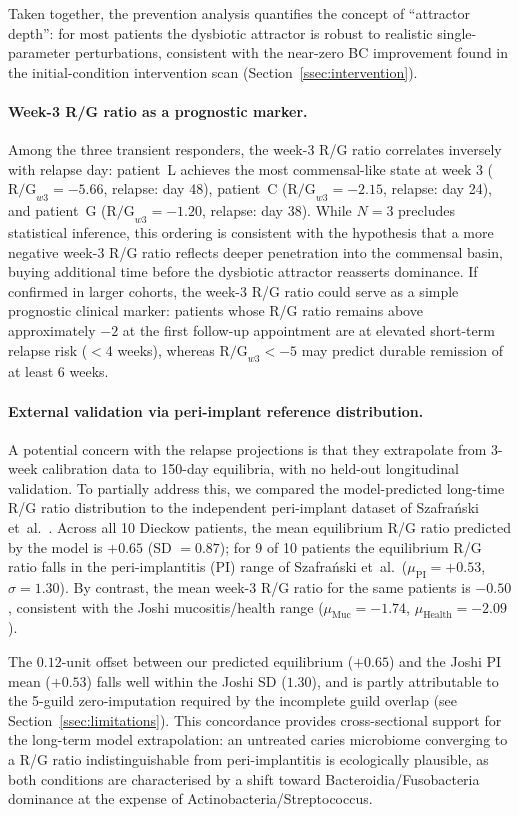 \documentclass[11pt,a4paper]{article}
\begin{document}
Taken together, the prevention analysis quantifies the concept of ``attractor depth'':
for most patients the dysbiotic attractor is robust to realistic single-parameter
perturbations, consistent with the near-zero BC improvement found in the initial-condition
intervention scan (Section~\ref{ssec:intervention}).

\paragraph{Week-3 R/G ratio as a prognostic marker.}
Among the three transient responders, the week-3 R/G ratio correlates inversely with relapse day:
patient~L achieves the most commensal-like state at week 3
($\text{R/G}_{w3} = -5.66$, relapse: day 48), patient~C
($\text{R/G}_{w3} = -2.15$, relapse: day 24), and patient~G
($\text{R/G}_{w3} = -1.20$, relapse: day 38).
While $N=3$ precludes statistical inference, this ordering is consistent with the hypothesis
that a more negative week-3 R/G ratio reflects deeper penetration into the commensal basin,
buying additional time before the dysbiotic attractor reasserts dominance.
If confirmed in larger cohorts, the week-3 R/G ratio could serve as a simple prognostic
clinical marker: patients whose R/G ratio remains above approximately $-2$ at the first
follow-up appointment are at elevated short-term relapse risk ($<$4 weeks), whereas
$\text{R/G}_{w3} < -5$ may predict durable remission of at least 6 weeks.

\paragraph{External validation via peri-implant reference distribution.}
A potential concern with the relapse projections is that they extrapolate from
3-week calibration data to 150-day equilibria, with no held-out longitudinal validation.
To partially address this, we compared the model-predicted long-time R/G ratio distribution
to the independent peri-implant dataset of Szafra\'{n}ski et~al.~\citep{szafranski2025}.
Across all 10 Dieckow patients, the mean equilibrium R/G ratio predicted by the model is
$+0.65$ (SD $=0.87$); for 9 of 10 patients the equilibrium R/G ratio falls in the
peri-implantitis (PI) range of Szafra\'{n}ski et~al.\ ($\mu_\mathrm{PI}=+0.53$, $\sigma=1.30$).
By contrast, the mean week-3 R/G ratio for the same patients is $-0.50$, consistent with
the Joshi mucositis/health range ($\mu_\mathrm{Muc}=-1.74$, $\mu_\mathrm{Health}=-2.09$).

The $0.12$-unit offset between our predicted equilibrium ($+0.65$) and the
Joshi PI mean ($+0.53$) falls well within the Joshi SD ($1.30$), and is partly
attributable to the 5-guild zero-imputation required by the incomplete guild
overlap (see Section~\ref{ssec:limitations}).
This concordance provides cross-sectional support for the long-term model extrapolation:
an untreated caries microbiome converging to a R/G ratio indistinguishable from
peri-implantitis is ecologically plausible, as both conditions are characterised by
a shift toward Bacteroidia/Fusobacteria dominance at the expense of Actinobacteria/Streptococcus.
\end{document}
